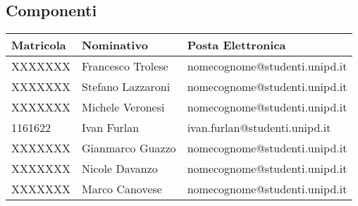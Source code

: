 \subsection{Componenti}
\begin{center}

	\begin{longtable}{p{4cm}|p{4cm}|p{6cm}}
		\arrayrulecolor{white}
		\hline
		\rowcolor{blue!20}
		\textbf{Matricola}  &
		\textbf{Nominativo} &
		\textbf{Posta Elettronica}                                              \\
		\hline
		XXXXXXX             & Francesco Trolese & nomecognome@studenti.unipd.it \\
		XXXXXXX             & Stefano Lazzaroni & nomecognome@studenti.unipd.it \\
		XXXXXXX             & Michele Veronesi  & nomecognome@studenti.unipd.it \\
		1161622             & Ivan Furlan       & ivan.furlan@studenti.unipd.it \\
		XXXXXXX             & Gianmarco Guazzo  & nomecognome@studenti.unipd.it \\
		XXXXXXX             & Nicole Davanzo    & nomecognome@studenti.unipd.it \\
		XXXXXXX             & Marco Canovese    & nomecognome@studenti.unipd.it \\
	\end{longtable}
\end{center}

